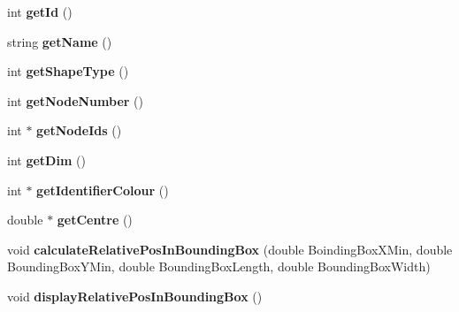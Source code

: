 \begin{DoxyCompactItemize}
\item 
\hypertarget{classShapeBase_ab55ac0089ea8e37649b0d85409c008ac}{}int {\bfseries get\+Id} ()\label{classShapeBase_ab55ac0089ea8e37649b0d85409c008ac}

\item 
\hypertarget{classShapeBase_a49d134532a98fb0cecacec44baf2baf3}{}string {\bfseries get\+Name} ()\label{classShapeBase_a49d134532a98fb0cecacec44baf2baf3}

\item 
\hypertarget{classShapeBase_a7ae6deee4256eb19c6e99b52a40847cb}{}int {\bfseries get\+Shape\+Type} ()\label{classShapeBase_a7ae6deee4256eb19c6e99b52a40847cb}

\item 
\hypertarget{classShapeBase_a46ce732af56537977ce6a34832440309}{}int {\bfseries get\+Node\+Number} ()\label{classShapeBase_a46ce732af56537977ce6a34832440309}

\item 
\hypertarget{classShapeBase_a55c283eaee304f9056089987e9b65012}{}int $\ast$ {\bfseries get\+Node\+Ids} ()\label{classShapeBase_a55c283eaee304f9056089987e9b65012}

\item 
\hypertarget{classShapeBase_ad60d92b34044153a677a8bfc0a31a5df}{}int {\bfseries get\+Dim} ()\label{classShapeBase_ad60d92b34044153a677a8bfc0a31a5df}

\item 
\hypertarget{classShapeBase_af10ec5e87cab16541c892712cf58c54d}{}int $\ast$ {\bfseries get\+Identifier\+Colour} ()\label{classShapeBase_af10ec5e87cab16541c892712cf58c54d}

\item 
\hypertarget{classShapeBase_ab26e6cbde2c8a4f326c32a38de48bcc7}{}double $\ast$ {\bfseries get\+Centre} ()\label{classShapeBase_ab26e6cbde2c8a4f326c32a38de48bcc7}

\item 
\hypertarget{classShapeBase_a7d1235b3555a18328d1677e5b07458ff}{}void {\bfseries calculate\+Relative\+Pos\+In\+Bounding\+Box} (double Boinding\+Box\+X\+Min, double Bounding\+Box\+Y\+Min, double Bounding\+Box\+Length, double Bounding\+Box\+Width)\label{classShapeBase_a7d1235b3555a18328d1677e5b07458ff}

\item 
\hypertarget{classShapeBase_ae5e17514271f121498ed12cebae3aebe}{}void {\bfseries display\+Relative\+Pos\+In\+Bounding\+Box} ()\label{classShapeBase_ae5e17514271f121498ed12cebae3aebe}


\end{DoxyCompactItemize}
